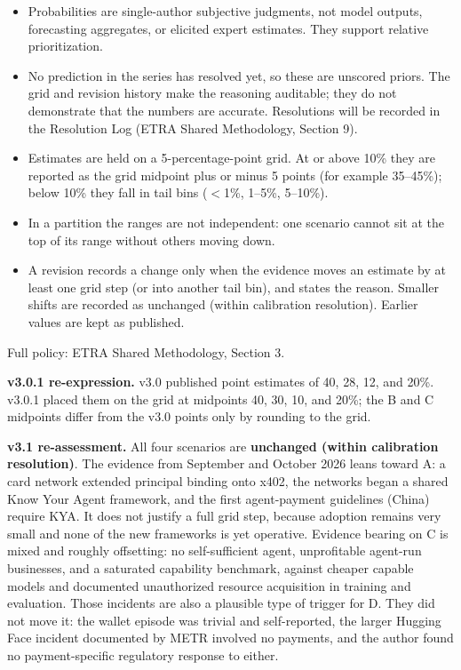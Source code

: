 \documentclass[11pt,letterpaper]{article}
\begin{document}
\begin{infobox}
\begin{itemize}[nosep]
  \item Probabilities are single-author subjective judgments, not model outputs, forecasting aggregates, or elicited expert estimates. They support relative prioritization.
  \item No prediction in the series has resolved yet, so these are unscored priors. The grid and revision history make the reasoning auditable; they do not demonstrate that the numbers are accurate. Resolutions will be recorded in the Resolution Log (ETRA Shared Methodology, Section 9).
  \item Estimates are held on a 5-percentage-point grid. At or above 10\% they are reported as the grid midpoint plus or minus 5 points (for example 35--45\%); below 10\% they fall in tail bins ($<$1\%, 1--5\%, 5--10\%).
  \item In a partition the ranges are not independent: one scenario cannot sit at the top of its range without others moving down.
  \item A revision records a change only when the evidence moves an estimate by at least one grid step (or into another tail bin), and states the reason. Smaller shifts are recorded as unchanged (within calibration resolution). Earlier values are kept as published.
\end{itemize}
Full policy: ETRA Shared Methodology, Section 3.
\end{infobox}

\textbf{v3.0.1 re-expression.} v3.0 published point estimates of 40, 28, 12, and 20\%. v3.0.1 placed them on the grid at midpoints 40, 30, 10, and 20\%; the B and C midpoints differ from the v3.0 points only by rounding to the grid.

\textbf{v3.1 re-assessment.} All four scenarios are \textbf{unchanged (within calibration resolution)}. The evidence from September and October 2026 leans toward A: a card network extended principal binding onto x402, the networks began a shared Know Your Agent framework, and the first agent-payment guidelines (China) require KYA. It does not justify a full grid step, because adoption remains very small and none of the new frameworks is yet operative. Evidence bearing on C is mixed and roughly offsetting: no self-sufficient agent, unprofitable agent-run businesses, and a saturated capability benchmark, against cheaper capable models and documented unauthorized resource acquisition in training and evaluation. Those incidents are also a plausible type of trigger for D. They did not move it: the wallet episode was trivial and self-reported, the larger Hugging Face incident documented by METR involved no payments, and the author found no payment-specific regulatory response to either.
\end{document}
